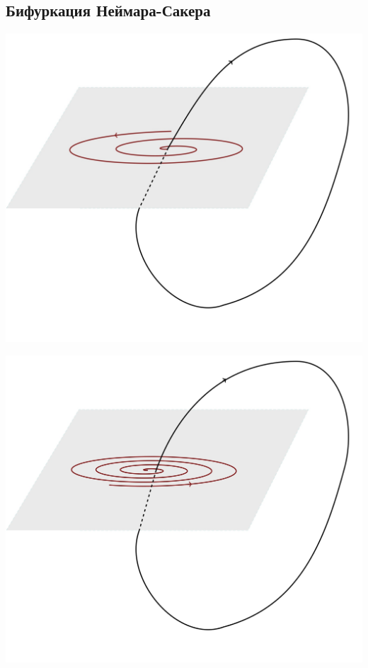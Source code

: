 \subsection{Бифуркация Неймара-Сакера}
\begin{center}
    \begin{minipage}{0.32\linewidth}
        \includegraphics[width=\linewidth]{fig/fig74.jpg} 
        \vspace{-50pt}
        \label{fig:1}
    \end{minipage}
\hfill     
    \begin{minipage}{0.3\linewidth}
        \includegraphics[width=\linewidth]{fig/fig75.jpg} 

\end{minipage}
\end{center}
